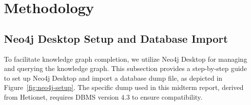 \section*{Methodology}

\subsection*{Neo4j Desktop Setup and Database Import}

To facilitate knowledge graph completion, we utilize Neo4j Desktop for managing and querying the knowledge graph. This subsection provides a step-by-step guide to set up Neo4j Desktop and import a database dump file, as depicted in Figure~\ref{fig:neo4j-setup}. The specific dump used in this midterm report, derived from Hetionet, requires DBMS version $4.3$ to ensure compatibility.

